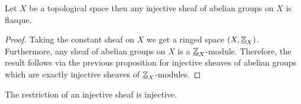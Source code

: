 \documentclass[12pt]{article}
\begin{document}
\begin{corollary}
Let $X$ be a topological space then any injective sheaf of abelian groups on $X$ is flasque.
\end{corollary}

\begin{proof}
Taking the constant sheaf on $X$ we get a ringed space $(X, \underline{\mathbb{Z}}_X)$. Furthermore, any sheaf of abelian groups on $X$ is a $\underline{\mathbb{Z}}_X$-module. Therefore, the result follows via the previous proposition for injective sheaves of abelian groups which are exactly injective sheaves of $\underline{\mathbb{Z}}_X$-modules.
\end{proof}

\begin{proposition}
The restriction of an injective sheaf is injective.
\end{proposition}
\end{document}
